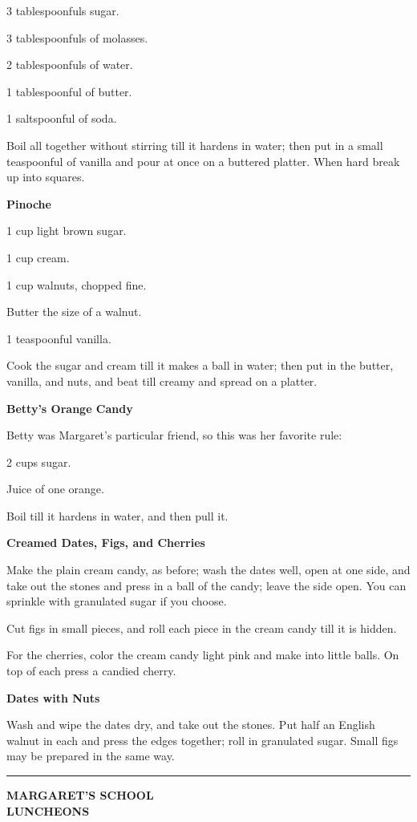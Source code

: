 \documentclass[11pt]{book}
\newcommand{\hstroke}{\rule[0.5ex]{5.0em}{0.2ex}}
\newcommand{\indpar}{\par\noindent\hspace*{\parindent}}
\newcommand{\ingredient}{\indpar}
\newcommand{\instruction}{\indpar}
\newenvironment{RecipeTitle}{\medskip\begin{center}\large\bf }{\end{center}\smallskip}
\newenvironment{FoodTypeTitle}{\begin{center}\large\bf }{\end{center}}
\begin{document}
\ingredient  3 tablespoonfuls sugar.
\ingredient  3 tablespoonfuls of molasses.
\ingredient  2 tablespoonfuls of water.
\ingredient  1 tablespoonful of butter.
\ingredient  1 saltspoonful of soda.
\instruction  Boil all together without stirring till it hardens in water;
then put in a small teaspoonful of vanilla and pour at once on
a buttered platter.  When hard break up into squares.
\begin{RecipeTitle}
Pinoche\label{pinoche}
\end{RecipeTitle}
\ingredient  1 cup light brown sugar.
\ingredient  1 cup cream.
\ingredient  1 cup walnuts, chopped fine.
\ingredient  Butter the size of a walnut.
\ingredient  1 teaspoonful vanilla.
\instruction  Cook the sugar and cream till it makes a ball in water; then
put in the butter, vanilla, and nuts, and beat till creamy and
spread on a platter.
\begin{RecipeTitle}
Betty's Orange Candy\label{bettys_orange_candy}
\end{RecipeTitle}
\instruction  Betty was Margaret's particular friend, so this was her
favorite rule:
\ingredient  2 cups sugar.
\ingredient  Juice of one orange.
\instruction  Boil till it hardens in water, and then pull it.
\begin{RecipeTitle}
Creamed Dates, Figs, and Cherries\label{creamed_dates_figs_cherries}
\end{RecipeTitle}
\instruction Make the plain cream candy, as before; wash the dates well,
open at one side, and take out the stones and press in a ball
of the candy; leave the side open.  You can sprinkle with
granulated sugar if you choose.
\instruction   Cut figs in small pieces, and roll each piece in the cream
candy till it is hidden.
\instruction   For the cherries, color the cream candy light pink and make
into little balls.  On top of each press a candied cherry.
\begin{RecipeTitle}
Dates with Nuts\label{dates_with_nuts}
\end{RecipeTitle}
\instruction  Wash and wipe the dates dry, and take out the stones.  Put
half an English walnut in each and press the edges together;
roll in granulated sugar.  Small figs may be prepared in the
same way.
\begin{center}
\hstroke
\end{center}
\medskip
\begin{FoodTypeTitle}
MARGARET'S SCHOOL\\
LUNCHEONS\label{SCHOOL_LUNCHEONS}
\end{FoodTypeTitle}
\medskip 
\end{document}
